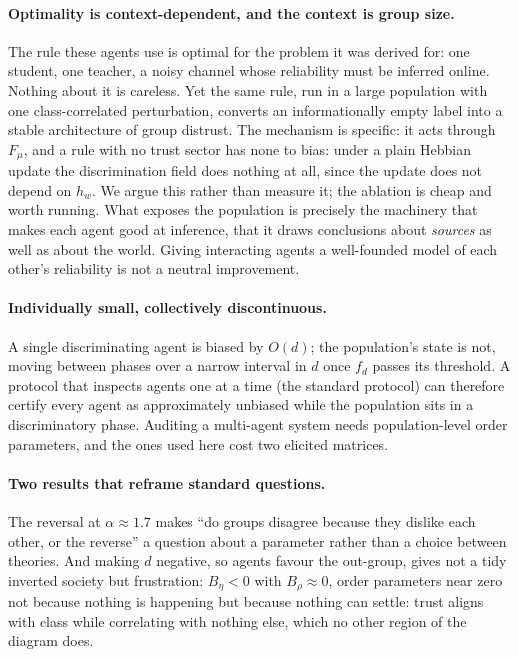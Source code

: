\documentclass{article}
\newcommand{\hw}{h_{w}}
\newcommand{\Fmu}{F_{\mu}}
\newcommand{\Brho}{B_{\rho}}
\newcommand{\Beta}{B_{\eta}}
\newcommand{\fd}{f_{d}}
\begin{document}
\paragraph{Optimality is context-dependent, and the context is group size.} The rule
these agents use is optimal for the problem it was derived for: one student, one
teacher, a noisy channel whose reliability must be inferred online. Nothing about it
is careless. Yet the same rule, run in a large population with one class-correlated
perturbation, converts an informationally empty label into a stable architecture of
group distrust. The mechanism is specific: it acts through $\Fmu$, and a rule with no
trust sector has none to bias: under a plain Hebbian update the discrimination
field does nothing at all, since the update does not depend on $\hw$. We argue this
rather than measure it; the ablation is cheap and worth running. What exposes the
population is precisely the machinery that makes each agent good at inference, that
it draws conclusions about \emph{sources} as well as about the world. Giving
interacting agents a well-founded model of each other's reliability is not a neutral
improvement.

\paragraph{Individually small, collectively discontinuous.} A single discriminating
agent is biased by $O(d)$; the population's state is not, moving between phases over
a narrow interval in $d$ once $\fd$ passes its threshold. A protocol that inspects
agents one at a time (the standard protocol) can therefore certify every agent
as approximately unbiased while the population sits in a discriminatory phase.
Auditing a multi-agent system needs population-level order parameters, and the ones
used here cost two elicited matrices.

\paragraph{Two results that reframe standard questions.} The reversal at
$\alpha\approx1.7$ makes ``do groups disagree because they dislike each other, or the
reverse'' a question about a parameter rather than a choice between theories. And
making $d$ negative, so agents favour the out-group, gives not a tidy inverted
society but frustration:
$\Beta<0$ with $\Brho\approx0$, order parameters near zero not because nothing is
happening but because nothing can settle: trust aligns with class while correlating
with nothing else, which no other region of the diagram does.
\end{document}
